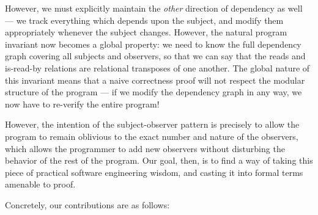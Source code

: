 \documentclass[preprint,natbib]{sigplanconf}
\begin{document}
However, we must explicitly maintain the \emph{other} direction of
dependency as well --- we track everything which depends upon the
subject, and modify them appropriately whenever the subject changes.
However, the natural program invariant now becomes a global property:
we need to know the full dependency graph covering all subjects and
observers, so that we can say that the reads and is-read-by relations
are relational transposes of one another. The global nature of this
invariant means that a naive correctness proof will not respect the
modular structure of the program --- if we modify the dependency graph
in any way, we now have to re-verify the entire program!

However, the intention of the subject-observer pattern is
precisely to allow the program to remain oblivious to the exact number
and nature of the observers, which allows the programmer to add new
observers without disturbing the behavior of the rest of the program.
Our goal, then, is to find a way of taking this piece of practical
software engineering wisdom, and casting it into formal terms amenable
to proof.

Concretely, our contributions are as follows: 
\end{document}
